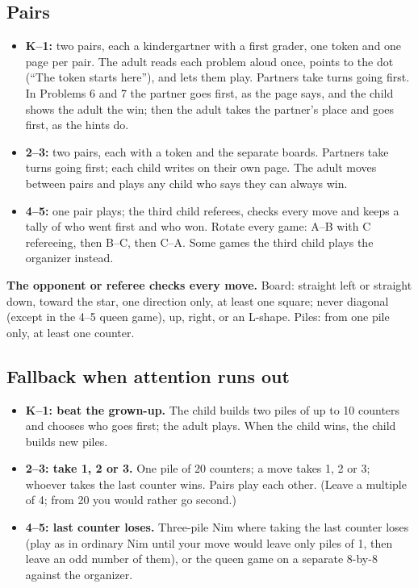 \documentclass[10pt]{article}
\begin{document}
\subsection{Pairs}
\begin{itemize}
\item \textbf{K--1:} two pairs, each a kindergartner with a first grader, one token and one page per pair. The adult reads each problem aloud once, points to the dot (``The token starts here''), and lets them play. Partners take turns going first. In Problems 6 and 7 the partner goes first, as the page says, and the child shows the adult the win; then the adult takes the partner's place and goes first, as the hints do.
\item \textbf{2--3:} two pairs, each with a token and the separate boards. Partners take turns going first; each child writes on their own page. The adult moves between pairs and plays any child who says they can always win.
\item \textbf{4--5:} one pair plays; the third child referees, checks every move and keeps a tally of who went first and who won. Rotate every game: A--B with C refereeing, then B--C, then C--A. Some games the third child plays the organizer instead.
\end{itemize}
\textbf{The opponent or referee checks every move.} Board: straight left or straight down, toward the star, one direction only, at least one square; never diagonal (except in the 4--5 queen game), up, right, or an L-shape. Piles: from one pile only, at least one counter.

\subsection{Fallback when attention runs out}
\begin{itemize}
\item \textbf{K--1: beat the grown-up.} The child builds two piles of up to 10 counters and chooses who goes first; the adult plays. When the child wins, the child builds new piles.
\item \textbf{2--3: take 1, 2 or 3.} One pile of 20 counters; a move takes 1, 2 or 3; whoever takes the last counter wins. Pairs play each other. (Leave a multiple of 4; from 20 you would rather go second.)
\item \textbf{4--5: last counter loses.} Three-pile Nim where taking the last counter loses (play as in ordinary Nim until your move would leave only piles of 1, then leave an odd number of them), or the queen game on a separate 8-by-8 against the organizer.
\end{itemize}
\end{document}
